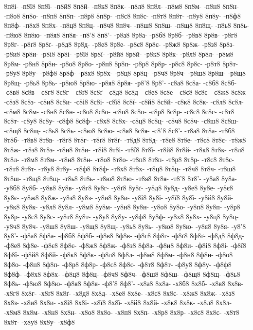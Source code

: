 {8п8і-
-п8ї8
8п8ї-
-п8й8
8п8й-
-п8к8
8п8к-
-п8л8
8п8л-
-п8м8
8п8м-
-п8н8
8п8н-
-п8о8
8п8о-
-п8п8
8п8п-
-п8р8
8п8р-
-п8с8
8п8с-
-п8т8
8п8т-
-п8у8
8п8у-
-п8ф8
8п8ф-
-п8х8
8п8х-
-п8ц8
8п8ц-
-п8ч8
8п8ч-
-п8ш8
8п8ш-
-п8щ8
8п8щ-
-п8ь8
8п8ь-
-п8ю8
8п8ю-
-п8я8
8п8я-
-п8'8
8п8'-
-р8а8
8р8а-
-р8б8
8р8б-
-р8в8
8р8в-
-р8г8
8р8г-
-р8ґ8
8р8ґ-
-р8д8
8р8д-
-р8е8
8р8е-
-р8є8
8р8є-
-р8ж8
8р8ж-
-р8з8
8р8з-
-р8и8
8р8и-
-р8і8
8р8і-
-р8ї8
8р8ї-
-р8й8
8р8й-
-р8к8
8р8к-
-р8л8
8р8л-
-р8м8
8р8м-
-р8н8
8р8н-
-р8о8
8р8о-
-р8п8
8р8п-
-р8р8
8р8р-
-р8с8
8р8с-
-р8т8
8р8т-
-р8у8
8р8у-
-р8ф8
8р8ф-
-р8х8
8р8х-
-р8ц8
8р8ц-
-р8ч8
8р8ч-
-р8ш8
8р8ш-
-р8щ8
8р8щ-
-р8ь8
8р8ь-
-р8ю8
8р8ю-
-р8я8
8р8я-
-р8'8
8р8'-
-с8а8
8с8а-
-с8б8
8с8б-
-с8в8
8с8в-
-с8г8
8с8г-
-с8ґ8
8с8ґ-
-с8д8
8с8д-
-с8е8
8с8е-
-с8є8
8с8є-
-с8ж8
8с8ж-
-с8з8
8с8з-
-с8и8
8с8и-
-с8і8
8с8і-
-с8ї8
8с8ї-
-с8й8
8с8й-
-с8к8
8с8к-
-с8л8
8с8л-
-с8м8
8с8м-
-с8н8
8с8н-
-с8о8
8с8о-
-с8п8
8с8п-
-с8р8
8с8р-
-с8с8
8с8с-
-с8т8
8с8т-
-с8у8
8с8у-
-с8ф8
8с8ф-
-с8х8
8с8х-
-с8ц8
8с8ц-
-с8ч8
8с8ч-
-с8ш8
8с8ш-
-с8щ8
8с8щ-
-с8ь8
8с8ь-
-с8ю8
8с8ю-
-с8я8
8с8я-
-с8'8
8с8'-
-т8а8
8т8а-
-т8б8
8т8б-
-т8в8
8т8в-
-т8г8
8т8г-
-т8ґ8
8т8ґ-
-т8д8
8т8д-
-т8е8
8т8е-
-т8є8
8т8є-
-т8ж8
8т8ж-
-т8з8
8т8з-
-т8и8
8т8и-
-т8і8
8т8і-
-т8ї8
8т8ї-
-т8й8
8т8й-
-т8к8
8т8к-
-т8л8
8т8л-
-т8м8
8т8м-
-т8н8
8т8н-
-т8о8
8т8о-
-т8п8
8т8п-
-т8р8
8т8р-
-т8с8
8т8с-
-т8т8
8т8т-
-т8у8
8т8у-
-т8ф8
8т8ф-
-т8х8
8т8х-
-т8ц8
8т8ц-
-т8ч8
8т8ч-
-т8ш8
8т8ш-
-т8щ8
8т8щ-
-т8ь8
8т8ь-
-т8ю8
8т8ю-
-т8я8
8т8я-
-т8'8
8т8'-
-у8а8
8у8а-
-у8б8
8у8б-
-у8в8
8у8в-
-у8г8
8у8г-
-у8ґ8
8у8ґ-
-у8д8
8у8д-
-у8е8
8у8е-
-у8є8
8у8є-
-у8ж8
8у8ж-
-у8з8
8у8з-
-у8и8
8у8и-
-у8і8
8у8і-
-у8ї8
8у8ї-
-у8й8
8у8й-
-у8к8
8у8к-
-у8л8
8у8л-
-у8м8
8у8м-
-у8н8
8у8н-
-у8о8
8у8о-
-у8п8
8у8п-
-у8р8
8у8р-
-у8с8
8у8с-
-у8т8
8у8т-
-у8у8
8у8у-
-у8ф8
8у8ф-
-у8х8
8у8х-
-у8ц8
8у8ц-
-у8ч8
8у8ч-
-у8ш8
8у8ш-
-у8щ8
8у8щ-
-у8ь8
8у8ь-
-у8ю8
8у8ю-
-у8я8
8у8я-
-у8'8
8у8'-
-ф8а8
8ф8а-
-ф8б8
8ф8б-
-ф8в8
8ф8в-
-ф8г8
8ф8г-
-ф8ґ8
8ф8ґ-
-ф8д8
8ф8д-
-ф8е8
8ф8е-
-ф8є8
8ф8є-
-ф8ж8
8ф8ж-
-ф8з8
8ф8з-
-ф8и8
8ф8и-
-ф8і8
8ф8і-
-ф8ї8
8ф8ї-
-ф8й8
8ф8й-
-ф8к8
8ф8к-
-ф8л8
8ф8л-
-ф8м8
8ф8м-
-ф8н8
8ф8н-
-ф8о8
8ф8о-
-ф8п8
8ф8п-
-ф8р8
8ф8р-
-ф8с8
8ф8с-
-ф8т8
8ф8т-
-ф8у8
8ф8у-
-ф8ф8
8ф8ф-
-ф8х8
8ф8х-
-ф8ц8
8ф8ц-
-ф8ч8
8ф8ч-
-ф8ш8
8ф8ш-
-ф8щ8
8ф8щ-
-ф8ь8
8ф8ь-
-ф8ю8
8ф8ю-
-ф8я8
8ф8я-
-ф8'8
8ф8'-
-х8а8
8х8а-
-х8б8
8х8б-
-х8в8
8х8в-
-х8г8
8х8г-
-х8ґ8
8х8ґ-
-х8д8
8х8д-
-х8е8
8х8е-
-х8є8
8х8є-
-х8ж8
8х8ж-
-х8з8
8х8з-
-х8и8
8х8и-
-х8і8
8х8і-
-х8ї8
8х8ї-
-х8й8
8х8й-
-х8к8
8х8к-
-х8л8
8х8л-
-х8м8
8х8м-
-х8н8
8х8н-
-х8о8
8х8о-
-х8п8
8х8п-
-х8р8
8х8р-
-х8с8
8х8с-
-х8т8
8х8т-
-х8у8
8х8у-
-х8ф8
}
